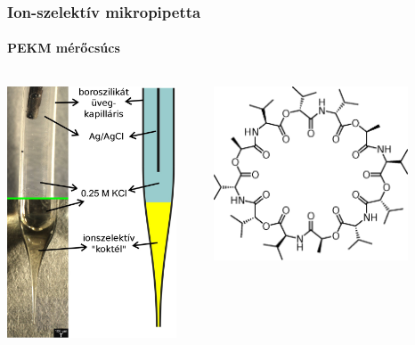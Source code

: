\documentclass{beamer}
\begin{document}
\begin{frame}
\frametitle{Ion-szelektív mikropipetta}
\framesubtitle{PEKM mérőcsúcs}
\begin{columns}[T] %
\begin{column}{.48\textwidth}

\centering
\includegraphics[width=0.9\textwidth]{liquid.eps}
\end{column}%
\hfill%
\begin{column}{.48\textwidth}
\centering

\includegraphics[width=0.8\textwidth]{Valinomycin.eps}


\end{column}
\end{columns}
\end{frame}
\end{document}
